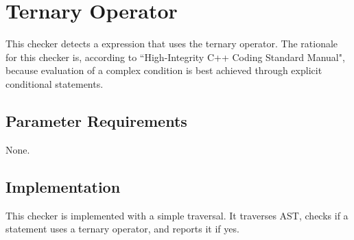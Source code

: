 %
%

\section{Ternary Operator}
\label{TernaryOperator::overview}

This checker detects a expression that uses the ternary operator. The rationale for this checker is, according to ``High-Integrity C++ Coding Standard Manual", because evaluation of a complex condition is best achieved through explicit conditional statements.

\subsection{Parameter Requirements}

None.

\subsection{Implementation}

This checker is implemented with a simple traversal. It traverses AST, checks if a statement uses a ternary operator, and reports it if yes.

